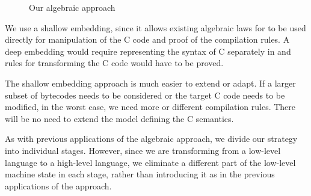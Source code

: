\begin{figure}
  \centering
  \caption{Our algebraic approach}
  \label{our-approach-figure}
\end{figure}

We use a shallow embedding, since it allows existing algebraic laws
for \Circus{} to be used directly for manipulation of the C code
and proof of the compilation rules.
A deep embedding would require representing the syntax of C separately
in \Circus{} and rules for transforming the C code would have to be
proved.

The shallow embedding approach is much easier to extend or adapt. 
If a larger subset of bytecodes needs to be considered or the target C
code needs to be modified, in the worst case, we need more or
different \Circus{} compilation rules. 
There will be no need to extend the \Circus{} model defining the C
semantics.

As with previous applications of the algebraic approach, we divide our
strategy into individual stages.
However, since we are transforming from a low-level language to a
high-level language, we eliminate a different part of the low-level
machine state in each stage, rather than introducing it as in the
previous applications of the approach.

